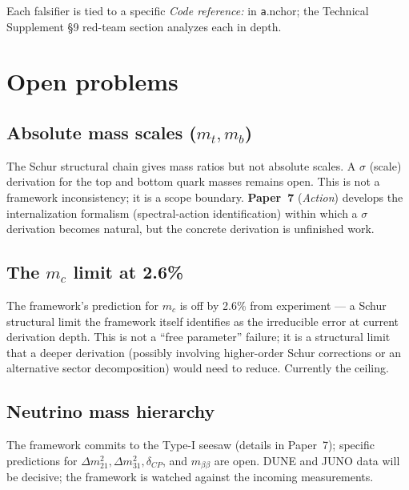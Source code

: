 \documentclass[11pt]{article}
\newcommand{\coderef}[2]{\smallskip\noindent\textit{Code reference:} \texttt{#1} in \texttt{#2}.}
\newcommand{\paperref}[2]{\textbf{Paper~#1} (\textit{#2})}
\theoremstyle{definition}
\begin{document}
Each falsifier is tied to a specific \coderef{} anchor; the Technical Supplement \S9 red-team section analyzes each in depth.

\section{Open problems}\label{sec:open_problems}

\subsection{Absolute mass scales (\texorpdfstring{$m_t, m_b$}{mt, mb})}\label{sec:open_masses}

The Schur structural chain gives mass ratios but not absolute scales. A $\sigma$ (scale) derivation for the top and bottom quark masses remains open. This is not a framework inconsistency; it is a scope boundary. \paperref{7}{Action} develops the internalization formalism (spectral-action identification) within which a $\sigma$ derivation becomes natural, but the concrete derivation is unfinished work.

\subsection{The \texorpdfstring{$m_c$}{mc} limit at 2.6\%}\label{sec:open_mc}

The framework's prediction for $m_c$ is off by 2.6\% from experiment --- a Schur structural limit the framework itself identifies as the irreducible error at current derivation depth. This is not a ``free parameter'' failure; it is a structural limit that a deeper derivation (possibly involving higher-order Schur corrections or an alternative sector decomposition) would need to reduce. Currently the ceiling.

\subsection{Neutrino mass hierarchy}\label{sec:open_nu_hierarchy}

The framework commits to the Type-I seesaw (details in Paper~7); specific predictions for $\Delta m^2_{21}, \Delta m^2_{31}, \delta_{CP}$, and $m_{\beta\beta}$ are open. DUNE and JUNO data will be decisive; the framework is watched against the incoming measurements.
\end{document}
